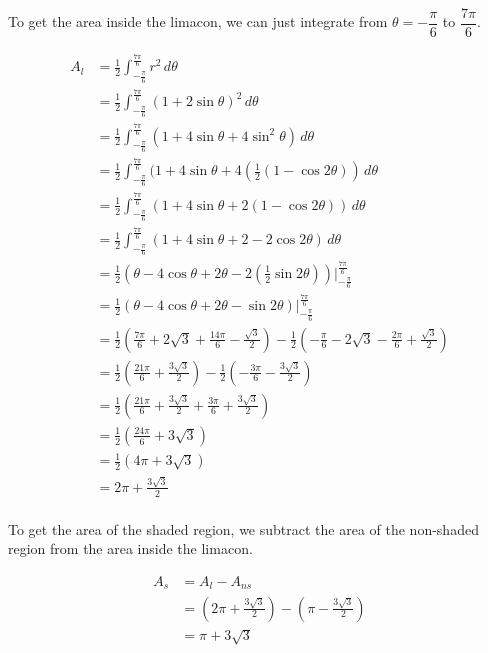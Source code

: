 To get the area inside the limacon, we can just integrate from $\theta = -\dfrac{\pi}{6}$ to $\dfrac{7\pi}{6}$.

\begin{align*}
A_{l} &= \frac{1}{2} \int_{-\frac{\pi}{6}}^{\frac{7\pi}{6}} r^2 \, d\theta \\ 
&= \frac{1}{2} \int_{-\frac{\pi}{6}}^{\frac{7\pi}{6}} (1 + 2 \sin \theta)^2 \, d\theta \\
&= \frac{1}{2} \int_{-\frac{\pi}{6}}^{\frac{7\pi}{6}} (1 + 4 \sin \theta + 4 \sin ^2 \theta) \, d\theta \\
&= \frac{1}{2} \int_{-\frac{\pi}{6}}^{\frac{7\pi}{6}} (1 + 4 \sin \theta + 4(\frac{1}{2}(1 - \cos 2\theta)) \, d\theta \\
&= \frac{1}{2} \int_{-\frac{\pi}{6}}^{\frac{7\pi}{6}} (1 + 4 \sin \theta + 2(1 - \cos 2\theta)) \, d\theta \\
&= \frac{1}{2} \int_{-\frac{\pi}{6}}^{\frac{7\pi}{6}} (1 + 4 \sin \theta + 2 - 2\cos 2\theta) \, d\theta \\
&= \frac{1}{2} \left(\theta - 4 \cos \theta + 2\theta - 2 (\frac{1}{2} \sin 2\theta) \right) \Bigg|_{-\frac{\pi}{6}}^{\frac{7\pi}{6}} \\ 
&= \frac{1}{2} \left(\theta - 4 \cos \theta + 2\theta - \sin 2\theta \right) \Bigg|_{-\frac{\pi}{6}}^{\frac{7\pi}{6}} \\
&= \frac{1}{2} \left(\frac{7\pi}{6} + 2\sqrt3 + \frac{14\pi}{6} - \frac{\sqrt 3}{2} \right) - \frac{1}{2} \left(- \frac{\pi}{6} - 2\sqrt3 - \frac{2\pi}{6} + \frac{\sqrt 3}{2} \right) \\
&= \frac{1}{2} \left(\frac{21\pi}{6} + \frac{3\sqrt 3}{2} \right) - \frac{1}{2} \left(-\frac{3\pi}{6} - \frac{3\sqrt 3}{2} \right) \\ 
&= \frac{1}{2} \left(\frac{21\pi}{6} + \frac{3\sqrt 3}{2} + \frac{3\pi}{6} + \frac{3\sqrt 3}{2} \right) \\ 
&= \frac{1}{2} \left(\frac{24\pi}{6} + 3 \sqrt 3 \right) \\ 
&= \frac{1}{2} \left(4\pi + 3 \sqrt 3 \right) \\ 
&= 2\pi + \frac{3 \sqrt 3}{2} \\ 
\end{align*}

To get the area of the shaded region, we subtract the area of the non-shaded region from the area inside the limacon.

\begin{align*}
A_s &= A_l - A_{ns} \\
&= \left(2\pi + \frac{3 \sqrt 3}{2}\right) - \left(\pi - \frac{3 \sqrt 3}{2}\right) \\
&= \boxed{\pi + 3 \sqrt 3}
\end{align*}
